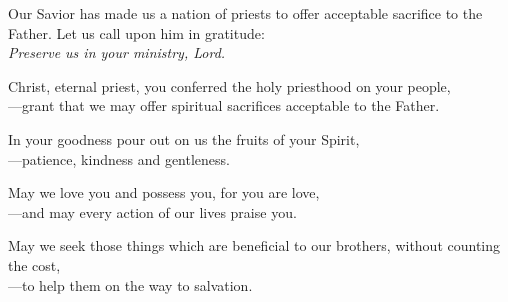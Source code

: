 \intercessions

\begin{raggedright}
Our Savior has made us a nation of priests to offer acceptable sacrifice to the Father. Let us call upon him in gratitude:\\
\emph{Preserve us in your ministry, Lord.}

\medskip
Christ, eternal priest, you conferred the holy priesthood on your people,\\
{\color{red}---}grant that we may offer spiritual sacrifices acceptable to the Father.

\medskip
In your goodness pour out on us the fruits of your Spirit,\\
{\color{red}---}patience, kindness and gentleness.

\medskip
May we love you and possess you, for you are love,\\
{\color{red}---}and may every action of our lives praise you.

\medskip
May we seek those things which are beneficial to our brothers, without counting the cost,\\
{\color{red}---}to help them on the way to salvation.
\end{raggedright}